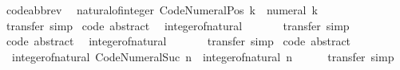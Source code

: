 \begin{isabellebody}
\endisatagproof
{\isafoldproof}%
%
\isadelimproof
\isanewline
%
\endisadelimproof
\isanewline
{}\isamarkupfalse%
\ {\isacharbrackleft}{\kern0pt}code{\isacharunderscore}{\kern0pt}abbrev{\isacharbrackright}{\kern0pt}{\isacharcolon}{\kern0pt}\isanewline
\ \ {\isachardoublequoteopen}natural{\isacharunderscore}{\kern0pt}of{\isacharunderscore}{\kern0pt}integer\ {\isacharparenleft}{\kern0pt}Code{\isacharunderscore}{\kern0pt}Numeral{\isachardot}{\kern0pt}Pos\ k{\isacharparenright}{\kern0pt}\ {\isacharequal}{\kern0pt}\ numeral\ k{\isachardoublequoteclose}\isanewline
%
\isadelimproof
\ \ %
\endisadelimproof
%
\isatagproof
{}\isamarkupfalse%
\ transfer\ simp%
\endisatagproof
{\isafoldproof}%
%
\isadelimproof
\isanewline
%
\endisadelimproof
\isanewline
{}\isamarkupfalse%
\ {\isacharbrackleft}{\kern0pt}code\ abstract{\isacharbrackright}{\kern0pt}{\isacharcolon}{\kern0pt}\isanewline
\ \ {\isachardoublequoteopen}integer{\isacharunderscore}{\kern0pt}of{\isacharunderscore}{\kern0pt}natural\ {}\ {\isacharequal}{\kern0pt}\ {}{\isachardoublequoteclose}\isanewline
%
\isadelimproof
\ \ %
\endisadelimproof
%
\isatagproof
{}\isamarkupfalse%
\ transfer\ simp%
\endisatagproof
{\isafoldproof}%
%
\isadelimproof
\isanewline
%
\endisadelimproof
\isanewline
{}\isamarkupfalse%
\ {\isacharbrackleft}{\kern0pt}code\ abstract{\isacharbrackright}{\kern0pt}{\isacharcolon}{\kern0pt}\isanewline
\ \ {\isachardoublequoteopen}integer{\isacharunderscore}{\kern0pt}of{\isacharunderscore}{\kern0pt}natural\ {}\ {\isacharequal}{\kern0pt}\ {}{\isachardoublequoteclose}\isanewline
%
\isadelimproof
\ \ %
\endisadelimproof
%
\isatagproof
{}\isamarkupfalse%
\ transfer\ simp%
\endisatagproof
{\isafoldproof}%
%
\isadelimproof
\isanewline
%
\endisadelimproof
\isanewline
{}\isamarkupfalse%
\ {\isacharbrackleft}{\kern0pt}code\ abstract{\isacharbrackright}{\kern0pt}{\isacharcolon}{\kern0pt}\isanewline
\ \ {\isachardoublequoteopen}integer{\isacharunderscore}{\kern0pt}of{\isacharunderscore}{\kern0pt}natural\ {\isacharparenleft}{\kern0pt}Code{\isacharunderscore}{\kern0pt}Numeral{\isachardot}{\kern0pt}Suc\ n{\isacharparenright}{\kern0pt}\ {\isacharequal}{\kern0pt}\ integer{\isacharunderscore}{\kern0pt}of{\isacharunderscore}{\kern0pt}natural\ n\ {\isacharplus}{\kern0pt}\ {}{\isachardoublequoteclose}\isanewline
%
\isadelimproof
\ \ %
\endisadelimproof
%
\isatagproof
{}\isamarkupfalse%
\ transfer\ simp%
\endisatagproof
{\isafoldproof}%
%
\isadelimproof

\end{isabellebody}

